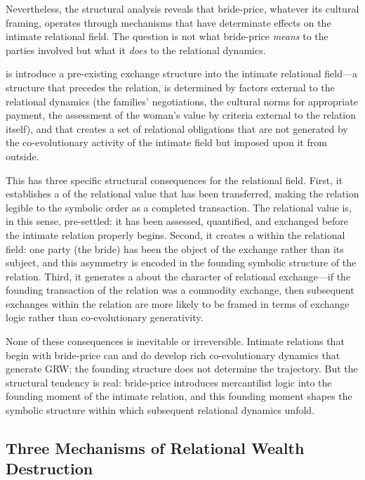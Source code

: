 Nevertheless, the structural analysis reveals that bride-price, whatever its cultural framing, operates through mechanisms that have determinate effects on the intimate relational field. The question is not what bride-price \emph{means} to the parties involved but what it \emph{does} to the relational dynamics.

 is introduce a pre-existing exchange structure into the intimate relational field---a structure that precedes the relation, is determined by factors external to the relational dynamics (the families' negotiations, the cultural norms for appropriate payment, the assessment of the woman's value by criteria external to the relation itself), and that creates a set of relational obligations that are not generated by the co-evolutionary activity of the intimate field but imposed upon it from outside.

This has three specific structural consequences for the relational field. First, it establishes a  of the relational value that has been transferred, making the relation legible to the symbolic order as a completed transaction. The relational value is, in this sense, pre-settled: it has been assessed, quantified, and exchanged before the intimate relation properly begins. Second, it creates a  within the relational field: one party (the bride) has been the object of the exchange rather than its subject, and this asymmetry is encoded in the founding symbolic structure of the relation. Third, it generates a  about the character of relational exchange---if the founding transaction of the relation was a commodity exchange, then subsequent exchanges within the relation are more likely to be framed in terms of exchange logic rather than co-evolutionary generativity.

None of these consequences is inevitable or irreversible. Intimate relations that begin with bride-price can and do develop rich co-evolutionary dynamics that generate GRW; the founding structure does not determine the trajectory. But the structural tendency is real: bride-price introduces mercantilist logic into the founding moment of the intimate relation, and this founding moment shapes the symbolic structure within which subsequent relational dynamics unfold.

\subsection{Three Mechanisms of Relational Wealth Destruction}
\label{p15:subsec:threemechanisms}

